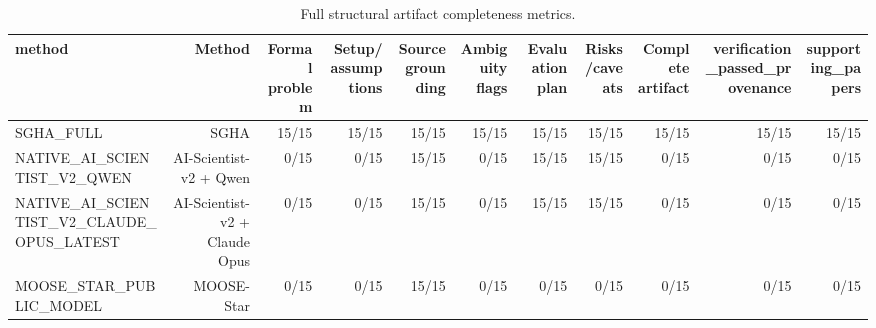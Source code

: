 \begin{table}[htbp]
\centering
\caption{Full structural artifact completeness metrics.}
\label{tab:structural\_artifacts\_full}
\begin{tabular}{lrrrrrrrrrr}
\toprule
method & Method & Formal problem & Setup/assumptions & Source grounding & Ambiguity flags & Evaluation plan & Risks/caveats & Complete artifact & verification\_passed\_provenance & supporting\_papers \\
\midrule
SGHA\_FULL & SGHA & 15/15 & 15/15 & 15/15 & 15/15 & 15/15 & 15/15 & 15/15 & 15/15 & 15/15 \\
NATIVE\_AI\_SCIENTIST\_V2\_QWEN & AI-Scientist-v2 + Qwen & 0/15 & 0/15 & 15/15 & 0/15 & 15/15 & 15/15 & 0/15 & 0/15 & 0/15 \\
NATIVE\_AI\_SCIENTIST\_V2\_CLAUDE\_OPUS\_LATEST & AI-Scientist-v2 + Claude Opus & 0/15 & 0/15 & 15/15 & 0/15 & 15/15 & 15/15 & 0/15 & 0/15 & 0/15 \\
MOOSE\_STAR\_PUBLIC\_MODEL & MOOSE-Star & 0/15 & 0/15 & 15/15 & 0/15 & 0/15 & 0/15 & 0/15 & 0/15 & 0/15 \\
\bottomrule
\end{tabular}
\end{table}

